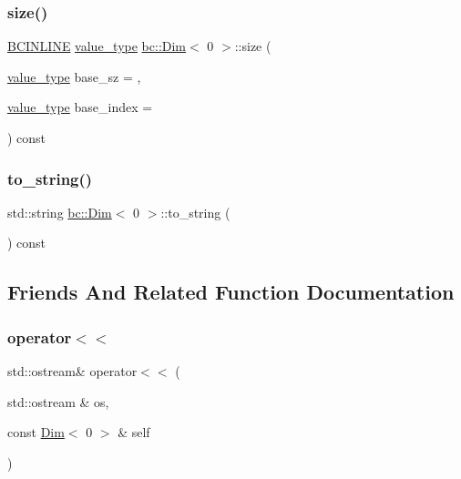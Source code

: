 \subsubsection{\texorpdfstring{size()}{size()}}
{\footnotesize\ttfamily \hyperlink{common_8h_a6699e8b0449da5c0fafb878e59c1d4b1}{B\+C\+I\+N\+L\+I\+NE} \hyperlink{structbc_1_1Dim_3_010_01_4_a561dbc6acbf3e9fe5c4a06aba2f8b968}{value\+\_\+type} \hyperlink{structbc_1_1Dim}{bc\+::\+Dim}$<$ 0 $>$\+::size (\begin{DoxyParamCaption}\item[{\hyperlink{structbc_1_1Dim_3_010_01_4_a561dbc6acbf3e9fe5c4a06aba2f8b968}{value\+\_\+type}}]{base\+\_\+sz = {},  }\item[{\hyperlink{structbc_1_1Dim_3_010_01_4_a561dbc6acbf3e9fe5c4a06aba2f8b968}{value\+\_\+type}}]{base\+\_\+index = {} }\end{DoxyParamCaption}) const\hspace{0.3cm}{\ttfamily [inline]}}

\mbox{\label{structbc_1_1Dim_3_010_01_4_a6a6aac045f9a73453c21ee9263ad049c}} 
\subsubsection{\texorpdfstring{to\+\_\+string()}{to\_string()}}
{\footnotesize\ttfamily std\+::string \hyperlink{structbc_1_1Dim}{bc\+::\+Dim}$<$ 0 $>$\+::to\+\_\+string (\begin{DoxyParamCaption}{ }\end{DoxyParamCaption}) const\hspace{0.3cm}{\ttfamily [inline]}}



\subsection{Friends And Related Function Documentation}
\mbox{\label{structbc_1_1Dim_3_010_01_4_afaa96bc6b1e916ec02928e3dcae05ad6}} 
\subsubsection{\texorpdfstring{operator$<$$<$}{operator<<}}
{\footnotesize\ttfamily std\+::ostream\& operator$<$$<$ (\begin{DoxyParamCaption}\item[{std\+::ostream \&}]{os,  }\item[{const \hyperlink{structbc_1_1Dim}{Dim}$<$ 0 $>$ \&}]{self }\end{DoxyParamCaption})\hspace{0.3cm}{\ttfamily [friend]}}



